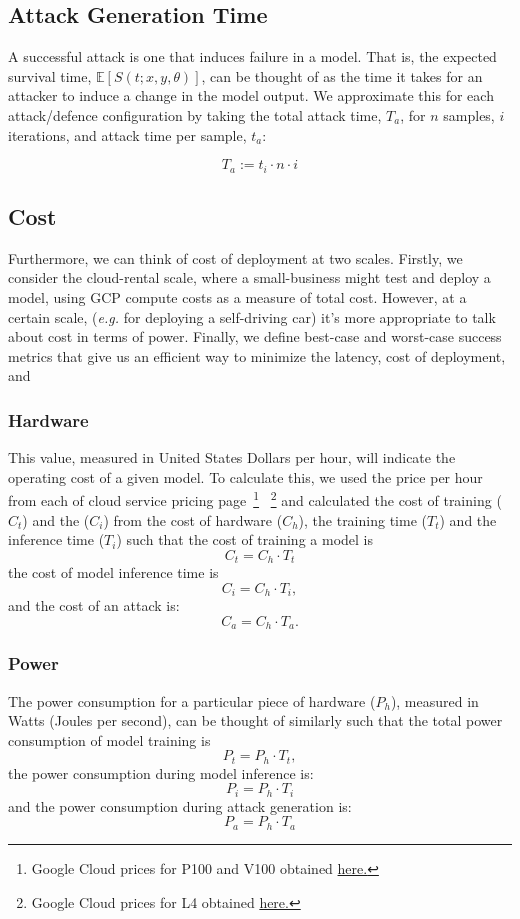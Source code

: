 \documentclass[conference]{IEEEtran}
\begin{document}
\subsection{Attack Generation Time}
A successful attack is one that induces failure in a model. That is, the expected survival time, $\mathbb{E}[S(t;x,y,\theta)]$, can be thought of as the time it takes for an attacker to induce a change in the model output. We approximate this for each attack/defence configuration by taking the total attack time, $T_a$, for $n$ samples, $i$ iterations, and attack time per sample, $t_a$:

$$
T_a := t_i \cdot n \cdot i 
$$



\subsection{Cost}
Furthermore, we can think of cost of deployment at two scales. Firstly, we consider the cloud-rental scale, where a small-business might test and deploy a model, using GCP compute costs as a measure of total cost. However, at a certain scale, (\textit{e.g.} for deploying a self-driving car) it's more appropriate to talk about cost in terms of power. Finally, we define best-case and worst-case success metrics that give us an efficient way to minimize the latency, cost of deployment, and 

\subsubsection{Hardware}
This value, measured in United States Dollars per hour, will indicate the operating cost of a given model. To calculate this, we used the price per hour from each of cloud service pricing page~\footnote{ Google Cloud prices for P100 and V100 obtained \href{https://cloud.google.com/compute/gpus-pricing}{here.} } ~\footnote{Google Cloud prices for L4 obtained  \href{https://cloud.google.com/compute/vm-instance-pricing#accelerator-optimized}{here.}} and calculated the cost of training ($C_{t}$) and the ($C_{i}$) from the cost of hardware ($C_{h}$), the training time ($T_{t}$) and the inference time ($T_{i}$) such that the cost of training a model is
$$
    C_t = C_h \cdot T_t
    \label{eq:cost_training}
$$
the cost of model inference time is
$$
    C_i = C_h \cdot T_i,
    \label{eq:cost_inference}
$$
and the cost of an attack is:
$$
    C_a = C_h \cdot  T_a.
    \label{eq:cost_attack}
$$

\subsubsection{Power}
The power consumption for a particular piece of hardware ($P_h$), measured in Watts (Joules per second), can be thought of similarly such that the total power consumption of model training is
$$
    P_t = P_h \cdot T_t,
    \label{eq:power_training}
$$
the power consumption during model inference is:
$$
    P_i = P_h \cdot T_i
    \label{eq:power_inference}
$$
and the power consumption during attack generation is:
$$
    P_a = P_h \cdot T_a
    \label{eq:power_attack}
$$
\end{document}
